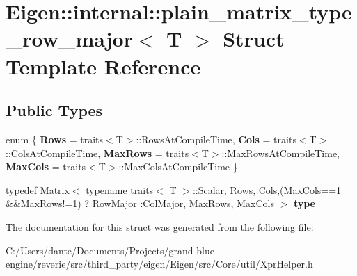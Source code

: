 \hypertarget{struct_eigen_1_1internal_1_1plain__matrix__type__row__major}{}\section{Eigen\+::internal\+::plain\+\_\+matrix\+\_\+type\+\_\+row\+\_\+major$<$ T $>$ Struct Template Reference}
\label{struct_eigen_1_1internal_1_1plain__matrix__type__row__major}
\subsection*{Public Types}
\begin{DoxyCompactItemize}
\item 
\mbox{\label{struct_eigen_1_1internal_1_1plain__matrix__type__row__major_a7c93d08859bcd153563dddf257ecd7a1}} 
enum \{ {\bfseries Rows} = traits$<$T$>$\+::Rows\+At\+Compile\+Time, 
{\bfseries Cols} = traits$<$T$>$\+::Cols\+At\+Compile\+Time, 
{\bfseries Max\+Rows} = traits$<$T$>$\+::Max\+Rows\+At\+Compile\+Time, 
{\bfseries Max\+Cols} = traits$<$T$>$\+::Max\+Cols\+At\+Compile\+Time
 \}
\item 
\mbox{\label{struct_eigen_1_1internal_1_1plain__matrix__type__row__major_a0b9ddb023beca38784f402c4a5836982}} 
typedef \mbox{\hyperlink{class_eigen_1_1_matrix}{Matrix}}$<$ typename \mbox{\hyperlink{struct_eigen_1_1internal_1_1traits}{traits}}$<$ T $>$\+::Scalar, Rows, Cols,(Max\+Cols==1 \&\&Max\+Rows!=1) ? Row\+Major \+:Col\+Major, Max\+Rows, Max\+Cols $>$ {\bfseries type}
\end{DoxyCompactItemize}


The documentation for this struct was generated from the following file\+:\begin{DoxyCompactItemize}
\item 
C\+:/\+Users/dante/\+Documents/\+Projects/grand-\/blue-\/engine/reverie/src/third\+\_\+party/eigen/\+Eigen/src/\+Core/util/Xpr\+Helper.\+h\end{DoxyCompactItemize}

